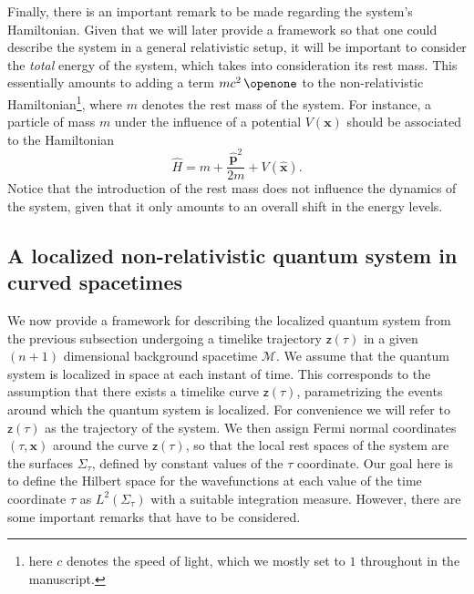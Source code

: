 \documentclass[prd,twocolumn,superscriptaddress,floatfix,amsmath,amssymb,amsfonts,longbibliography,nofootinbib]{revtex4-1}
\newcommand{\mf}{\mathsf}%
\begin{document}
Finally, there is an important remark to be made regarding the system's Hamiltonian. Given that we will later provide a framework so that one could describe the system in a general relativistic setup, it will be important to consider the \emph{total} energy of the system, which takes into consideration its rest mass. This essentially amounts to adding a term $m c^2 \,\openone$ to the non-relativistic Hamiltonian\footnote{here $c$ denotes the speed of light, which we mostly set to $1$ throughout in the manuscript.}, where $m$ denotes the rest mass of the system. For instance, a particle of mass $m$ under the influence of a potential $V(\bm x)$ should be associated to the Hamiltonian
\begin{equation}\label{eq:HO}
    \hat{H} = m + \frac{\hat{\bm p}^2}{2m} + V(\hat{\bm x}).
\end{equation}
Notice that the introduction of the rest mass does not influence the dynamics of the system, given that it only amounts to an overall shift in the energy levels.




\subsection{A localized non-relativistic quantum system in curved spacetimes}\label{sub:main}

We now provide a framework for describing the localized quantum system from the previous subsection undergoing a timelike trajectory $\mf z(\tau)$ in a given $(n+1)$ dimensional background spacetime $\mathcal{M}$. We assume that the quantum system is localized in space at each instant of time. This corresponds to the assumption that there exists a timelike curve $\mf z(\tau)$, parametrizing the events around which the quantum system is localized. For convenience we will refer to $\mf z(\tau)$ as the trajectory of the system. We then assign Fermi normal coordinates $(\tau,\bm x)$ around the curve $\mf z(\tau)$, so that the local rest spaces of the system are the surfaces $\Sigma_\tau$, defined by constant values of the $\tau$ coordinate. Our goal here is to define the Hilbert space for the wavefunctions at each value of the time coordinate $\tau$ as $L^2(\Sigma_\tau)$ with a suitable integration measure. However, there are some important remarks that have to be considered. 
\end{document}
